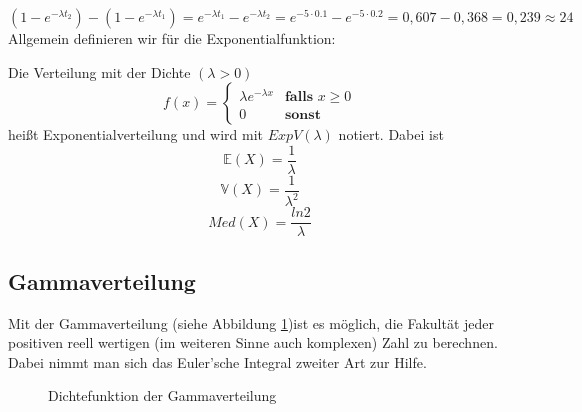 {    \[
    \left(1-e^{-\lambda t_{2}}\right)-\left(1-e^{-\lambda
    t_{1}}\right)=e^{-\lambda t_{1}}-e^{-\lambda
    t_{2}}=e^{-5\cdot 0.1}-e^{-5\cdot 0.2}=0,607-0,368=0,239\approx 24
    \]
    Allgemein definieren wir für die Exponentialfunktion:

    \begin{definition}
    Die Verteilung mit der Dichte $\left(\lambda >0\right)$ 
    \[
    f\left(x\right)=\begin{cases}
        \lambda e^{-\lambda x} & \textbf{falls $x\ge 0$}\\
        0 & \textbf{sonst}
        \end{cases}
    \]
    heißt Exponentialverteilung und wird mit $ExpV\left(\lambda\right)$
    notiert. Dabei ist
    \[\mathbb E\left(X\right)=\frac{1}{\lambda }\]
    \[\mathbb V\left(X\right)=\frac{1}{\lambda ^{2}}\]
    \[Med\left(X\right)=\frac{ln2}{\lambda}\]
    \end{definition}
    
    \subsection{Gammaverteilung}

    \label{sec:gammaverteilung}

    Mit der Gammaverteilung (siehe Abbildung \ref{fig:gammaverteilung})ist es möglich, die Fakultät jeder positiven
    reell wertigen (im weiteren Sinne auch komplexen) Zahl zu berechnen.
    Dabei nimmt man sich das Euler'sche Integral zweiter
    Art zur Hilfe.

    {
        \def\avala{1}
        \def\lvala{2}

        \def\avalb{2}
        \def\lvalb{2}

        \def\avalc{3}
        \def\lvalc{2}

        \def\avald{1}
        \def\lvald{3}

        \def\avale{1}
        \def\lvale{1}

        \def\xmax{7}
        \begin{figure}
            \begin{tikzpicture}
                
            \end{tikzpicture}
            \caption{Dichtefunktion der Gammaverteilung}
           \label{fig:gammaverteilung}
        \end{figure}
    }


}
